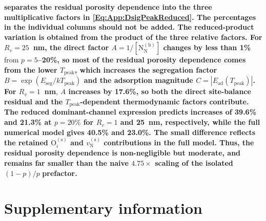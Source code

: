 \documentclass[preprint,12pt,sort&compress]{elsarticle}
\newcommand{\?}{\stackrel{?}{=}}
\providecommand{\DIFaddtex}[1]{{\bf #1}} %
\providecommand{\DIFdeltex}[1]{} %
\providecommand{\DIFaddbegin}{\protect\color{blue}} %
\providecommand{\DIFaddend}{\protect\color{black}} %
\providecommand{\DIFdelbegin}{\protect\color{red}} %
\providecommand{\DIFdelend}{\protect\color{black}} %
\providecommand{\DIFadd}[1]{\texorpdfstring{\DIFaddtex{#1}}{#1}} %
\providecommand{\DIFdel}[1]{\texorpdfstring{\DIFdeltex{#1}}{}} %
\begin{document}
\DIFdelbegin \DIFdel{\Cref{Tab:App:por} quantifies both effects for $w_\text{O} = 1500$~ppm at intermediate stoichiometry. The variation column reports the total change in $|\Delta\sigma|_\text{peak}$ (from \cref{Eq:App:DsigPeakReduced}) relative to $p = 5\%$. For $R_v = 25$~nm (the conditions of \cref{Fig:p_w_plot}), the total change in peak $|\Delta\sigma|$ }\DIFdelend \DIFaddbegin \DIFadd{ separates the residual porosity dependence into the three multiplicative factors in \cref{Eq:App:DsigPeakReduced}. The percentages in the individual columns should not be added. The reduced-product variation is obtained from the product of the three relative factors. For $R_v=25$~nm, the direct factor $A=1/[\text{N}_\text{N}^{(\text{b})}]$ changes by less than 1\% }\DIFaddend from \DIFdelbegin \DIFdel{$p = 5\%$ to $p = 20\%$ is only 8\%, almost entirely fromchannel~(b). For $R_v = 1$~nm, the total change is 26\% }\DIFdelend \DIFaddbegin \DIFadd{$p=5$--20\%, so most of the residual porosity dependence comes from the lower $T_\text{peak}$, which increases the segregation factor $B=\exp(E_\text{seg}/kT_\text{peak})$ and the adsorption magnitude $C=|E_\text{ad}(T_\text{peak})|$. For $R_v=1$~nm}\DIFaddend , \DIFdelbegin \DIFdel{with 18\% from channel~(a ) and 7\% from channel~(b). In both cases, the peak $|\Delta\sigma|$ changes by at most a factor of 1.3 over a fourfold increase in porosity, far smaller than the factor of 4.75 that the na\"ive }\DIFdelend \DIFaddbegin \DIFadd{$A$ increases by 17.6\%, so both the direct site-balance residual and the $T_\text{peak}$-dependent thermodynamic factors contribute. The reduced dominant-channel expression predicts increases of 39.6\% and 21.3\% at $p=20\%$ for $R_v=1$ and 25~nm, respectively, while the full numerical model gives 40.5\% and 23.0\%. The small difference reflects the retained $\text{O}_i^{(\text{s})}$ and $v_\text{N}^{(\text{s})}$ contributions in the full model. Thus, the residual porosity dependence is non-negligible but moderate, and remains far smaller than the naive $4.75\times$ scaling of the isolated }\DIFaddend $(1-p)/p$ \DIFdelbegin \DIFdel{scaling would suggest.
}\DIFdelend \DIFaddbegin \DIFadd{prefactor.
}\DIFaddend 

\DIFdelbegin %

\DIFdelend \section{Supplementary information}
\label{App3}
\end{document}

